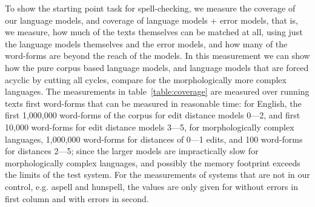 \documentclass[a4paper,12pt]{article}
\begin{document}
To show the starting point task for spell-checking, we measure the coverage of
our language models, and coverage of language models + error models, that is,
we measure, how much of the texts themselves can be matched at all, using just
the language models themselves and the error models, and how many of the
word-forms are beyond the reach of the models. In this measurement we can show
how the pure corpus based language models, and language models that are forced
acyclic by cutting all cycles, compare for the morphologically more complex
languages. The measurements in table~\ref{table:coverage} are measured
over running texts first word-forms that can be measured in reasonable time:
for English, the first 1,000,000 word-forms of the corpus for edit distance
models 0---2, and first 10,000 word-forms for edit distance models 3---5, for
morphologically complex languages, 1,000,000 word-forms for distances of 0---1
edits, and 100 word-forms for distances 2---5; since the larger models are
impractically slow for morphologically complex languages, and possibly the
memory footprint exceeds the limits of the test system. For the measurements of
systems that are not in our control, e.g. aspell and hunspell, the values
are only given for without errors in first column and with errors in second.
\end{document}
